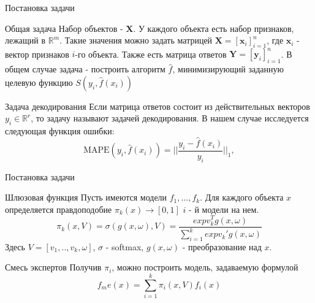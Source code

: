 \documentclass{beamer}
\begin{document}
\begin{frame}{Постановка задачи}
\begin{block}{Общая задача}
Набор объектов - $\mathbf{X}$.  У каждого объекта есть набор признаков,  лежащий в $\mathbb{R}^m$.  Такие значения можно задать матрицей 
$\mathbf{X} = [\mathbf{x}_i]_{i = 1}^n$, где $\mathbf{x}_i$ -  вектор признаков $i$-го объекта. Также есть матрица ответов $\mathbf{Y} = [\mathbf{y}_i]_{i = 1}^n$.  В общем случае задача - построить алгоритм $\hat{f}$, минимизирующий заданную целевую функцию $S(y_i, \hat{f}(x_i)) $
\end{block}


\begin{block}{Задача декодирования}
Если матрица ответов состоит из действительных векторов  $y_i \in \mathbb{R}^r$, то задачу называют задачей декодирования. В нашем случае исследуется следующая функция ошибки:
$$\text{MAPE}(y_i, \hat{f}(x_i)) = ||\frac{ y_i - \hat{f}(x_i)}{y_i} ||_1,$$
\end{block}

\end{frame}

\begin{frame}{Постановка задачи}


\begin{block}{Шлюзовая функция}
Пусть имеются модели $f_1, ..., f_k$.   Для каждого объекта $x$ определяется правдоподобие $\pi_k(x) \rightarrow [0, 1]$ $i$ - й модели на нем. 
$$ \pi_k(x, V) = \sigma(g(x, \omega), V) = \frac{exp v^T_k g(x, \omega)}{\sum\limits_{i = 1}^k exp v_k' g(x, \omega)}$$
Здесь  $V = [v_1, .., v_k, \omega]$, $\sigma$ - softmax, $g(x, \omega)$ - преобразование над $x$.
\end{block}


\begin{block}{Смесь экспертов}
Получив $\pi_i$, можно построить модель, задаваемую формулой 
$$ f_me(x) = \sum\limits_{i =1}^{k} \pi_i(x, V) f_i(x)$$
\end{block}

\end{frame}
\end{document}
